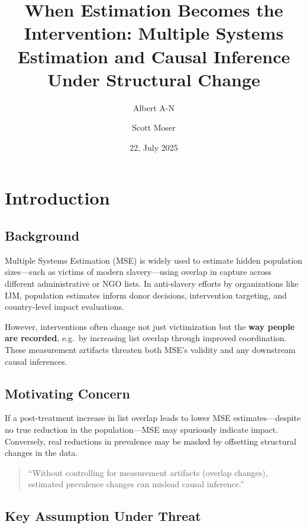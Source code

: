 \documentclass[
  12pt,
]{article}
\title{When Estimation Becomes the Intervention: Multiple Systems
Estimation and Causal Inference Under Structural Change}
\author{Albert A-N \and Scott Moser}
\date{22, July 2025}
\theoremstyle{plain}
\theoremstyle{definition}
\renewcommand*\contentsname{Table of contents}
\newcommand\contentsname{Table of contents}
\begin{document}
\maketitle

\renewcommand*\contentsname{Table of contents}
{
\hypersetup{linkcolor=}
\setcounter{tocdepth}{3}
\tableofcontents
}

\newpage

\section{Introduction}\label{introduction}

\subsection{Background}\label{background}

Multiple Systems Estimation (MSE) is widely used to estimate hidden
population sizes---such as victims of modern slavery---using overlap in
capture across different administrative or NGO lists. In anti-slavery
efforts by organizations like IJM, population estimates inform donor
decisions, intervention targeting, and country-level impact evaluations.

However, interventions often change not just victimization but the
\textbf{way people are recorded}, e.g.~by increasing list overlap
through improved coordination. These measurement artifacts threaten both
MSE's validity and any downstream causal inferences.

\subsection{Motivating Concern}\label{motivating-concern}

If a post-treatment increase in list overlap leads to lower MSE
estimates---despite no true reduction in the population---MSE may
spuriously indicate impact. Conversely, real reductions in prevalence
may be masked by offsetting structural changes in the data.

\begin{quote}
``Without controlling for measurement artifacts (overlap changes),
estimated prevalence changes can mislead causal inference.''
\end{quote}

\subsection{Key Assumption Under
Threat}\label{key-assumption-under-threat}
\end{document}

